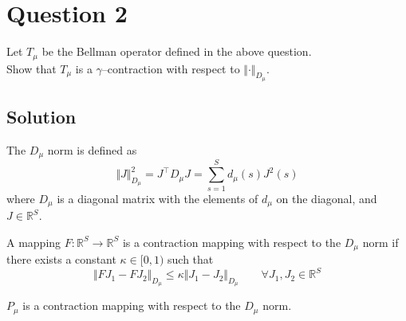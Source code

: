 \section*{Question 2}

Let \( T_{\mu} \) be the Bellman operator defined in the above question. \\
Show that \( T_{\mu} \) is a \( \gamma \)--contraction with respect to \( {\Vert \cdot \Vert}_{D_{\mu}} \).

\subsection*{Solution}

\begin{definition}
    The \( D_{\mu} \) norm is defined as
    \[
        \Vert J \Vert_{D_{\mu}}^2
        =
        J^{\top} D_{\mu} J
        =
        \sum_{s=1}^{S} d_{\mu}(s) J^2(s)
    \]
    where \( D_{\mu} \) is a diagonal matrix with the elements of \( d_\mu \) on the diagonal, and \( J \in \mathbb{R}^{S} \).
\end{definition}

\begin{definition}
    A mapping \( F: \mathbb{R}^{S} \to \mathbb{R}^{S} \) is a contraction mapping with respect to the \( D_{\mu} \) norm if there exists a constant \( \kappa \in [0, 1) \) such that
    \[
        \Vert F J_{1} - F J_{2} \Vert_{D_{\mu}} \leq \kappa \Vert J_{1} - J_{2} \Vert_{D_{\mu}}
        \qquad \forall J_{1}, J_{2} \in \mathbb{R}^{S}
    \]
\end{definition}

\begin{lemma}\label{P_mu-contraction}
    \( P_{\mu} \) is a contraction mapping with respect to the \( D_{\mu} \) norm.
\end{lemma}

